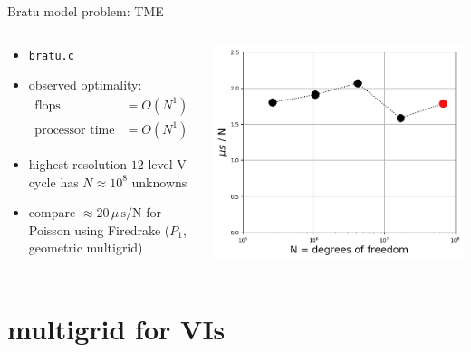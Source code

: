 \documentclass[svgnames,
               hyperref={colorlinks,citecolor=DeepPink4,linkcolor=FireBrick,urlcolor=Maroon},
               usepdftitle=false]  %
               {beamer}
\begin{document}
\begin{frame}{Bratu model problem: TME}

\begin{columns}
\begin{column}{0.45\textwidth}
\begin{itemize}
\item \texttt{bratu.c}
\item observed optimality:
\begin{align*}
\text{flops} &= O(N^1) \\
\text{processor time} &= O(N^1)
\end{align*}
\item highest-resolution {\color{FireBrick} $12$-level V-cycle} has $N\approx 10^8$ unknowns
\item compare $\approx 20\,\mu\,\text{s}/\text{N}$ for Poisson using Firedrake ($P_1$, geometric multigrid)
\end{itemize}
\end{column}
\begin{column}{0.55\textwidth}
\includegraphics[width=\textwidth]{figs/bratu-time.png}
\end{column}
\end{columns}
\end{frame}


\section{multigrid for VIs}
\end{document}
